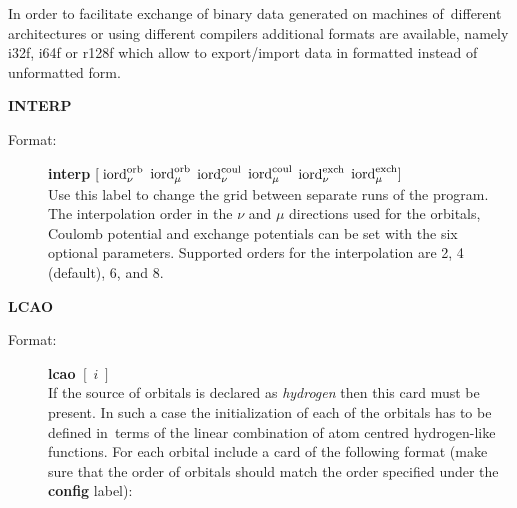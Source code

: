 \documentclass[12pt,a4paper]{article}
\begin{document}
\begin{description}
\begin{description}
  In order to facilitate exchange of binary data generated on machines of~different
  architectures or using different compilers additional formats are available, namely
  i32f, i64f or r128f which allow to export/import data in formatted instead of
  unformatted form.
\end{description}


\item \textbf{INTERP}
\begin{description}
\item[Format:] \textbf{interp} $[\; {\rm iord}_\nu^{\rm orb}$ ${\rm
    iord}_\mu^{\rm orb}$ ${\rm iord}_\nu^{\rm coul}$ ${\rm
    iord}_\mu^{\rm coul}$ ${\rm iord}_\nu^{\rm exch}$ ${\rm
    iord}_\mu^{\rm exch} ]$\\ Use this label to change the grid
  between separate runs of the program. The interpolation order in the
  $\nu$ and $\mu$ directions used for the orbitals, Coulomb potential
  and exchange potentials can be set with the six optional
  parameters. Supported orders for the interpolation are 2, 4
  (default), 6, and 8.
\end{description}




\item \textbf{LCAO}
\begin{description}
\item[Format:] \textbf{lcao} $[\;i\;]$\\ If the source of orbitals is declared as
  \textsl{hydrogen} then this card must be present. In such a case the initialization of
  each of the orbitals has to be defined in~terms of the linear combination of atom
  centred hydrogen-like functions. For each orbital include a card of the following format
  (make sure that the order of orbitals should match the order specified under the
  \textbf{config} label):


\end{description}
\end{description}
\end{document}
